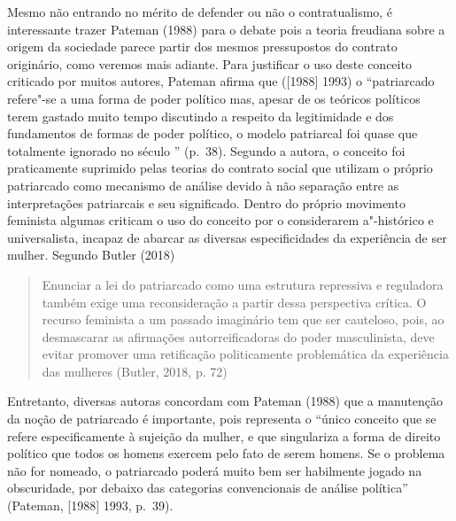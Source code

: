Mesmo não entrando no mérito de defender ou não o contratualismo, é
interessante trazer Pateman (1988) para o debate pois a teoria freudiana
sobre a origem da sociedade parece partir dos mesmos pressupostos do
contrato originário, como veremos mais adiante. Para justificar o uso
deste conceito criticado por muitos autores, Pateman afirma que
({[}1988{]} 1993) o ``patriarcado refere"-se a uma forma de poder político
mas, apesar de os teóricos políticos terem gastado muito tempo
discutindo a respeito da legitimidade e dos fundamentos de formas de
poder político, o modelo patriarcal foi quase que totalmente ignorado no
século '' (p.~38). Segundo a autora, o conceito foi praticamente
suprimido pelas teorias do contrato social que utilizam o próprio
patriarcado como mecanismo de análise devido à não separação entre as
interpretações patriarcais e seu significado. Dentro do próprio
movimento feminista algumas criticam o uso do conceito por o
considerarem a"-histórico e universalista, incapaz de abarcar as diversas
especificidades da experiência de ser mulher. Segundo Butler (2018)

\begin{quote}
Enunciar a lei do patriarcado como uma estrutura repressiva e reguladora
também exige uma reconsideração a partir dessa perspectiva crítica. O
recurso feminista a um passado imaginário tem que ser cauteloso, pois,
ao desmascarar as afirmações autorreificadoras do poder masculinista,
deve evitar promover uma retificação politicamente problemática da
experiência das mulheres (Butler, 2018, p. 72)
\end{quote}

Entretanto, diversas autoras concordam com Pateman (1988) que a
manutenção da noção de patriarcado é importante, pois representa o
``único conceito que se refere especificamente à sujeição da mulher, e
 que singulariza a forma de direito político que todos os homens exercem
 pelo fato de serem homens. Se o problema não for nomeado, o patriarcado
 poderá muito bem ser habilmente jogado na obscuridade, por debaixo das
 categorias convencionais de análise política'' (Pateman, {[}1988{]} 1993,
p.~39).

